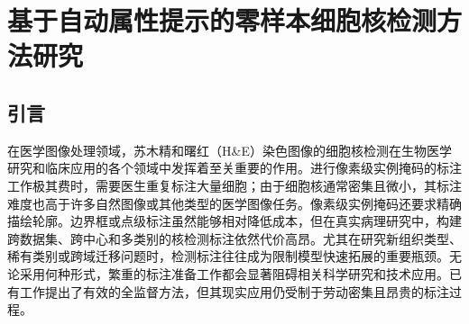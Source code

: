 \chapter{基于自动属性提示的零样本细胞核检测方法研究}

\section{引言}
在医学图像处理领域，苏木精和曙红（H\&E）染色图像的细胞核检测在生物医学研究和临床应用的各个领域中发挥着至关重要的作用\cite{gleason1992histologic}。进行像素级实例掩码的标注工作极其费时，需要医生重复标注大量细胞；由于细胞核通常密集且微小，其标注难度也高于许多自然图像或其他类型的医学图像任务。像素级实例掩码还要求精确描绘轮廓。边界框或点级标注虽然能够相对降低成本，但在真实病理研究中，构建跨数据集、跨中心和多类别的核检测标注依然代价高昂。尤其在研究新组织类型、稀有类别或跨域迁移问题时，检测标注往往成为限制模型快速拓展的重要瓶颈。无论采用何种形式，繁重的标注准备工作都会显著阻碍相关科学研究和技术应用。已有工作\cite{mahanta2021ihc,graham2019hover,yi2019multi}提出了有效的全监督方法，但其现实应用仍受制于劳动密集且昂贵的标注过程。

